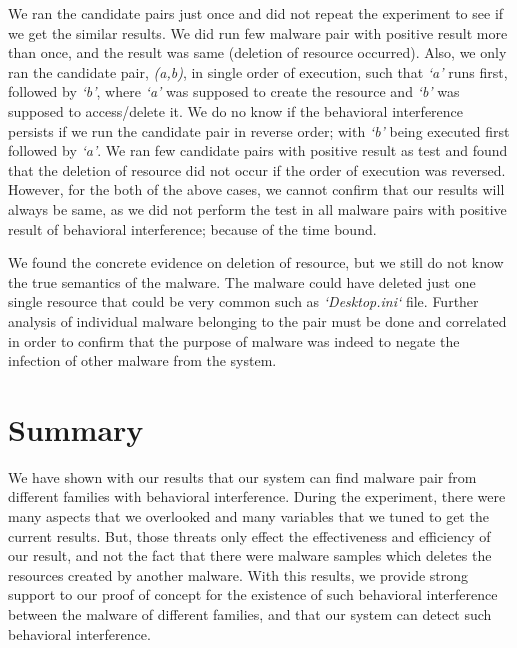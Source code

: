 We ran the candidate pairs just once and did not repeat the experiment to see if we get the similar results.
We did run few malware pair with positive result more than once, and the result was same (deletion of resource occurred).
Also, we only ran the candidate pair, \emph{(a,b)}, in single order of execution, such that \emph{`a'} runs first, followed by \emph{`b'}, where \emph{`a'} was supposed to create the resource and \emph{`b'} was supposed to access/delete it.
We do no know if the behavioral interference persists if we run the candidate pair in reverse order; with \emph{`b'} being executed first followed by \emph{`a'}.
We ran few candidate pairs with positive result as test and found that the deletion of resource did not occur if the order of execution was reversed.
However, for the both of the above cases, we cannot confirm that our results will always be same, as we did not perform the test in all malware pairs with positive result of behavioral interference; because of the time bound.

We found the concrete evidence on deletion of resource, but we still do not know the true semantics of the malware.
The malware could have deleted just one single resource that could be very common such as \emph{`Desktop.ini`} file.
Further analysis of individual malware belonging to the pair must be done and correlated in order to confirm that the purpose of malware was indeed to negate the infection of other malware from the system.
\section{Summary}
\label{sec:Summary}

We have shown with our results that our system can find malware pair from different families with behavioral interference.
During the experiment, there were  many aspects that we overlooked and many variables that we tuned to get the current results.
But, those threats only effect the effectiveness and efficiency of our result, and not the fact that there were malware samples which deletes the resources created by another malware.
With this results, we provide strong support to our proof of concept for the existence of such behavioral interference between the malware of different families, and that our system can detect such behavioral interference.


